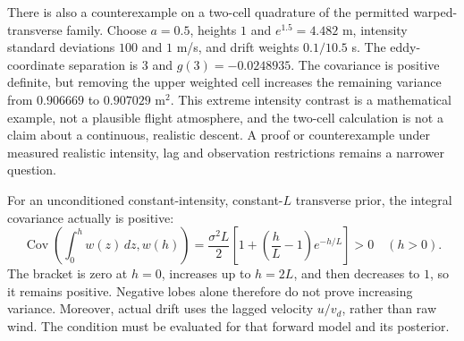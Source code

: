 There is also a counterexample on a two-cell quadrature of the permitted warped-transverse family. Choose $a=0.5$, heights $1$ and $e^{1.5}=4.482$ m, intensity standard deviations $100$ and $1$ m/s, and drift weights $0.1/10.5$ s. The eddy-coordinate separation is $3$ and $g(3)=-0.0248935$. The covariance is positive definite, but removing the upper weighted cell increases the remaining variance from $0.906669$ to $0.907029$ m$^2$. This extreme intensity contrast is a mathematical example, not a plausible flight atmosphere, and the two-cell calculation is not a claim about a continuous, realistic descent. A proof or counterexample under measured realistic intensity, lag and observation restrictions remains a narrower question.

For an unconditioned constant-intensity, constant-$L$ transverse prior, the integral covariance actually is positive:
\begin{equation}
 \operatorname{Cov}\left(\int_0^h w(z)\,dz,w(h)\right)
 =\frac{\sigma^2 L}{2}\left[1+\left(\frac hL-1\right)e^{-h/L}\right]>0\quad(h>0).
\end{equation}
The bracket is zero at $h=0$, increases up to $h=2L$, and then decreases to $1$, so it remains positive. Negative lobes alone therefore do not prove increasing variance. Moreover, actual drift uses the lagged velocity $u/v_d$, rather than raw wind. The condition must be evaluated for that forward model and its posterior.
